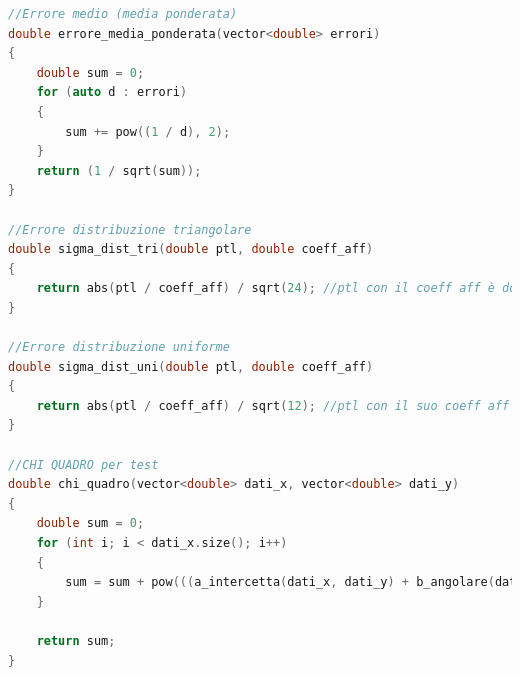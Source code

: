 \documentclass[a4paper,11pt,oneside]{article}
\begin{document}
\begin{lstlisting}[language=C++, label=lst:statistica.h, caption=statistica.h]
//Errore medio (media ponderata)
double errore_media_ponderata(vector<double> errori)
{
    double sum = 0;
    for (auto d : errori)
    {
        sum += pow((1 / d), 2);
    }
    return (1 / sqrt(sum));
}

//Errore distribuzione triangolare
double sigma_dist_tri(double ptl, double coeff_aff)
{
    return abs(ptl / coeff_aff) / sqrt(24); //ptl con il coeff aff è doppio di err max
}

//Errore distribuzione uniforme
double sigma_dist_uni(double ptl, double coeff_aff)
{
    return abs(ptl / coeff_aff) / sqrt(12); //ptl con il suo coeff aff è il doppio di err max
}

//CHI QUADRO per test
double chi_quadro(vector<double> dati_x, vector<double> dati_y)
{
    double sum = 0;
    for (int i; i < dati_x.size(); i++)
    {
        sum = sum + pow(((a_intercetta(dati_x, dati_y) + b_angolare(dati_x, dati_y) * dati_x[i]) - dati_y[i]),2);
    }

    return sum;
}
\end{lstlisting}
\end{document}
